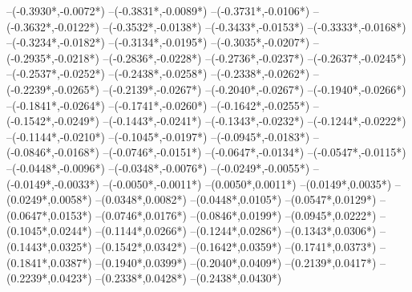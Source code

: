 {	--({-0.3930*\xskala},{-0.0072*\yskala})
	--({-0.3831*\xskala},{-0.0089*\yskala})
	--({-0.3731*\xskala},{-0.0106*\yskala})
	--({-0.3632*\xskala},{-0.0122*\yskala})
	--({-0.3532*\xskala},{-0.0138*\yskala})
	--({-0.3433*\xskala},{-0.0153*\yskala})
	--({-0.3333*\xskala},{-0.0168*\yskala})
	--({-0.3234*\xskala},{-0.0182*\yskala})
	--({-0.3134*\xskala},{-0.0195*\yskala})
	--({-0.3035*\xskala},{-0.0207*\yskala})
	--({-0.2935*\xskala},{-0.0218*\yskala})
	--({-0.2836*\xskala},{-0.0228*\yskala})
	--({-0.2736*\xskala},{-0.0237*\yskala})
	--({-0.2637*\xskala},{-0.0245*\yskala})
	--({-0.2537*\xskala},{-0.0252*\yskala})
	--({-0.2438*\xskala},{-0.0258*\yskala})
	--({-0.2338*\xskala},{-0.0262*\yskala})
	--({-0.2239*\xskala},{-0.0265*\yskala})
	--({-0.2139*\xskala},{-0.0267*\yskala})
	--({-0.2040*\xskala},{-0.0267*\yskala})
	--({-0.1940*\xskala},{-0.0266*\yskala})
	--({-0.1841*\xskala},{-0.0264*\yskala})
	--({-0.1741*\xskala},{-0.0260*\yskala})
	--({-0.1642*\xskala},{-0.0255*\yskala})
	--({-0.1542*\xskala},{-0.0249*\yskala})
	--({-0.1443*\xskala},{-0.0241*\yskala})
	--({-0.1343*\xskala},{-0.0232*\yskala})
	--({-0.1244*\xskala},{-0.0222*\yskala})
	--({-0.1144*\xskala},{-0.0210*\yskala})
	--({-0.1045*\xskala},{-0.0197*\yskala})
	--({-0.0945*\xskala},{-0.0183*\yskala})
	--({-0.0846*\xskala},{-0.0168*\yskala})
	--({-0.0746*\xskala},{-0.0151*\yskala})
	--({-0.0647*\xskala},{-0.0134*\yskala})
	--({-0.0547*\xskala},{-0.0115*\yskala})
	--({-0.0448*\xskala},{-0.0096*\yskala})
	--({-0.0348*\xskala},{-0.0076*\yskala})
	--({-0.0249*\xskala},{-0.0055*\yskala})
	--({-0.0149*\xskala},{-0.0033*\yskala})
	--({-0.0050*\xskala},{-0.0011*\yskala})
	--({0.0050*\xskala},{0.0011*\yskala})
	--({0.0149*\xskala},{0.0035*\yskala})
	--({0.0249*\xskala},{0.0058*\yskala})
	--({0.0348*\xskala},{0.0082*\yskala})
	--({0.0448*\xskala},{0.0105*\yskala})
	--({0.0547*\xskala},{0.0129*\yskala})
	--({0.0647*\xskala},{0.0153*\yskala})
	--({0.0746*\xskala},{0.0176*\yskala})
	--({0.0846*\xskala},{0.0199*\yskala})
	--({0.0945*\xskala},{0.0222*\yskala})
	--({0.1045*\xskala},{0.0244*\yskala})
	--({0.1144*\xskala},{0.0266*\yskala})
	--({0.1244*\xskala},{0.0286*\yskala})
	--({0.1343*\xskala},{0.0306*\yskala})
	--({0.1443*\xskala},{0.0325*\yskala})
	--({0.1542*\xskala},{0.0342*\yskala})
	--({0.1642*\xskala},{0.0359*\yskala})
	--({0.1741*\xskala},{0.0373*\yskala})
	--({0.1841*\xskala},{0.0387*\yskala})
	--({0.1940*\xskala},{0.0399*\yskala})
	--({0.2040*\xskala},{0.0409*\yskala})
	--({0.2139*\xskala},{0.0417*\yskala})
	--({0.2239*\xskala},{0.0423*\yskala})
	--({0.2338*\xskala},{0.0428*\yskala})
	--({0.2438*\xskala},{0.0430*\yskala})
}
